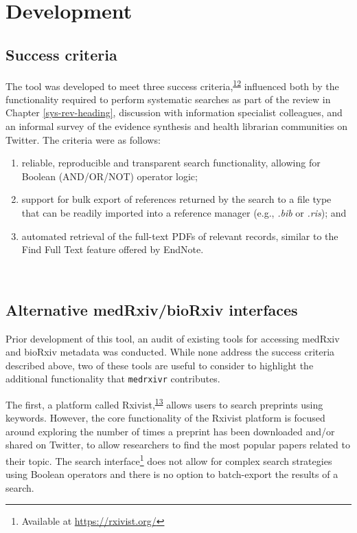 \documentclass[a4paper, twoside]{templates/ociamthesis}
\begin{document}
\hypertarget{development}{%
\section{Development}\label{development}}

\hypertarget{success-criteria}{%
\subsection{Success criteria}\label{success-criteria}}

The tool was developed to meet three success criteria,\textsuperscript{\protect\hyperlink{ref-wateridge1995}{12}} influenced both by the functionality required to perform systematic searches as part of the review in Chapter \ref{sys-rev-heading}, discussion with information specialist colleagues, and an informal survey of the evidence synthesis and health librarian communities on Twitter. The criteria were as follows:

\begin{enumerate}
\def\labelenumi{\arabic{enumi}.}
\item
  reliable, reproducible and transparent search functionality, allowing for Boolean (AND/OR/NOT) operator logic;
\item
  support for bulk export of references returned by the search to a file type that can be readily imported into a reference manager (e.g., \emph{.bib} or \emph{.ris}); and
\item
  automated retrieval of the full-text PDFs of relevant records, similar to the Find Full Text feature offered by EndNote.
\end{enumerate}

~

\hypertarget{alternative-medrxivbiorxiv-interfaces}{%
\subsection{Alternative medRxiv/bioRxiv interfaces}\label{alternative-medrxivbiorxiv-interfaces}}

Prior development of this tool, an audit of existing tools for accessing medRxiv and bioRxiv metadata was conducted. While none address the success criteria described above, two of these tools are useful to consider to highlight the additional functionality that \texttt{medrxivr} contributes.

The first, a platform called Rxivist,\textsuperscript{\protect\hyperlink{ref-abdill2019}{13}} allows users to search preprints using keywords. However, the core functionality of the Rxivist platform is focused around exploring the number of times a preprint has been downloaded and/or shared on Twitter, to allow researchers to find the most popular papers related to their topic. The search interface\footnote{Available at \url{https://rxivist.org/}} does not allow for complex search strategies using Boolean operators and there is no option to batch-export the results of a search.
\end{document}
